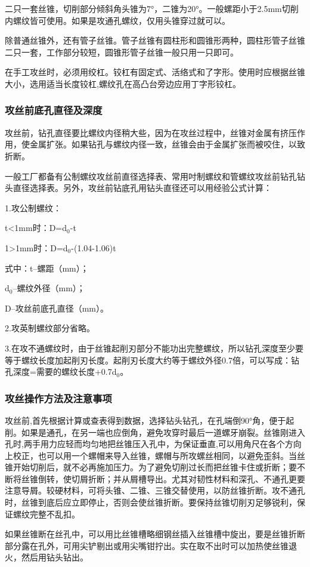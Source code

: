 \documentclass{ctexbook}
\begin{document}
二只一套丝锥，切削部分倾斜角头锥为7°，二锥为20°。一般螺距小于2.5mm切削内螺纹皆可使用。如果是攻通孔螺纹，仅用头锥穿过就可以。

除普通丝锥外，还有管子丝锥。管子丝锥有圆柱形和圆锥形两种，圆柱形管子丝锥二只一套，工作部分较短，圆锥形管子丝锥一般只用一只即可。

在手工攻丝时，必须用绞杠。铰杠有固定式、活络式和了字形。使用时应根据丝锥大小，选用适当长度铰杠,螺纹孔在高凸台旁边应用丁字形铰杠。
\subsubsection{攻丝前底孔直径及深度}
攻丝前，钻孔直径要比螺纹内径稍大些，因为在攻丝过程中，丝锥对金属有挤压作用，使金属扩张。如果钻孔与螺纹内径一致，丝锥会由于金属扩张而被咬住，以致折断。

一般工厂都备有公制螺纹攻丝前直径选择表、常用吋制螺纹和管螺纹攻丝前钻孔钻头直径选择表。另外，攻丝前钻底孔用钻头直径还可以用经验公式计算：

1.攻公制螺纹：

t<1mm时：D=d$_0$-t

1>1mm时：D=d$_0$-(1.04-1.06)t

式中：t--螺距（mm）；

d$_0$--螺纹外径（mm）；

D--攻丝前底孔直径（mm）。

2.攻英制螺纹部分省略。

3.在攻不通螺纹时，由于丝锥起削刃部分不能功出完整螺纹，所以钻孔深度至少要等于螺纹长度加起削刃长度。起削刃长度大约等于螺纹外径0.7倍，可以写成：钻孔深度=需要的螺纹长度+0.7d$_0$。
\subsubsection{攻丝操作方法及注意事项}
攻丝前,首先根据计算或查表得到数据，选择钻头钻孔，在孔端倒90°角，便于起削。如果是通孔，在另一端也应倒角，避免攻穿时最后一道螺牙崩裂。丝锥刚进入孔时,两手用力应轻而均匀地把丝锥压入孔中，为保证垂直,可以用角尺在各个方向上校正，也可以用一个螺帽来导入丝锥，螺帽与所攻螺丝相同，以避免歪斜。当丝锥开始切削后，就不必再施加压力。为了避免切削过长而把丝锥卡住或折断；要不断将丝锥倒转，使切屑折断；并从屑槽导出。尤其对韧性材料和深孔、不通孔更要注意导屑。较硬材料，可将头锥、二锥、三锥交替使用，以防丝锥折断。攻不通孔时，丝锥到底后应立即停止，否则会使丝锥折断。要保持丝锥切削刃足够锐利，保证螺纹完整不乱扣。

如果丝锥断在丝孔中，可以用比丝锥槽略细钢丝插入丝锥槽中旋出，要是丝锥折断部分露在孔外，可用尖铲剔出或用尖嘴钳拧出。实在取不出时可以加热使丝锥退火，然后用钻头钻出。
\end{document}

